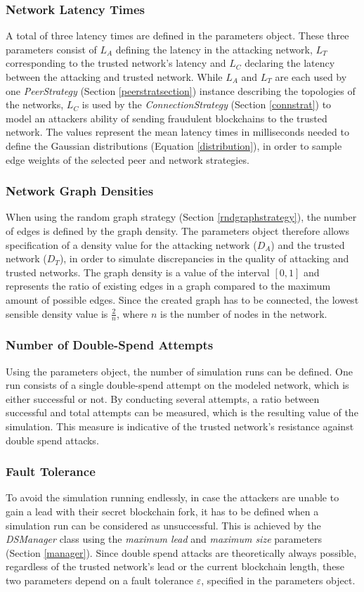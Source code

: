 \documentclass[a4paper,12pt,twoside]{report}
\begin{document}
\subsubsection{Network Latency Times}
A total of three latency times are defined in the parameters object. These three parameters consist of $L_A$ defining the latency in the attacking network, $L_T$ corresponding to the trusted network's latency and $L_C$ declaring the latency between the attacking and trusted network. While $L_A$ and $L_T$ are each used by one \textit{PeerStrategy} (Section \ref{peerstratsection}) instance describing the topologies of the networks, $L_C$ is used by the \textit{ConnectionStrategy} (Section \ref{connstrat}) to model an attackers ability of sending fraudulent blockchains to the trusted network. The values represent the mean latency times in milliseconds needed to define the Gaussian distributions (Equation \ref{distribution}), in order to sample edge weights of the selected peer and network strategies.
\subsubsection{Network Graph Densities}
When using the random graph strategy (Section \ref{rndgraphstrategy}), the number of edges is defined by the graph density. The parameters object therefore allows specification of a density value for the attacking network ($D_A$) and the trusted network ($D_T$), in order to simulate discrepancies in the quality of attacking and trusted networks. The graph density is a value of the interval $[0,1]$ and represents the ratio of existing edges in a graph compared to the maximum amount of possible edges. Since the created graph has to be connected, the lowest sensible density value is $\frac{2}{n}$, where $n$ is the number of nodes in the network.
\subsubsection{Number of Double-Spend Attempts}
Using the parameters object, the number of simulation runs can be defined. One run consists of a single double-spend attempt on the modeled network, which is either successful or not. By conducting several attempts, a ratio between successful and total attempts can be measured, which is the resulting value of the simulation. This measure is indicative of the trusted network's resistance against double spend attacks.
\subsubsection{Fault Tolerance}\label{faulttolerance}
To avoid the simulation running endlessly, in case the attackers are unable to gain a lead with their secret blockchain fork, it has to be defined when a simulation run can be considered as unsuccessful. This is achieved by the \textit{DSManager} class using the \textit{maximum lead} and \textit{maximum size} parameters (Section \ref{manager}). Since double spend attacks are theoretically always possible, regardless of the trusted network's lead or the current blockchain length, these two parameters depend on a fault tolerance $\varepsilon$, specified in the parameters object.
\end{document}
